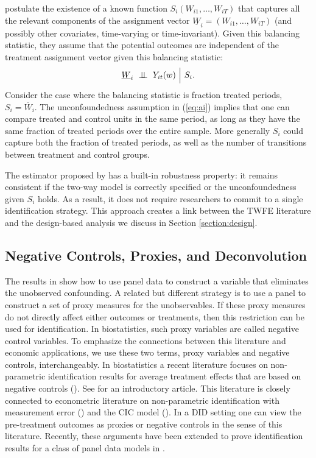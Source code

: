\documentclass[letterpaper,12pt,leqno]{article}
\newcommand{\indep}{\perp\!\!\!\perp}
\begin{document}
\citep*{arkhangelsky2022doubly} postulate the existence of a known function $S_i(W_{i1},\ldots,W_{iT})$ that captures all the relevant components of the assignment vector $\underline{W}_i=(W_{i1},\ldots,W_{iT})$ (and possibly other covariates, time-varying or time-invariant). Given this balancing statistic, they assume that the potential outcomes are independent of the treatment assignment vector given this balancing statistic:
\begin{equation}\label{eq:ai} \underline{W}_i\ \indep\  Y_{it}(w)\ \Bigl|\ S_i.\end{equation}
Consider the case where the balancing statistic is fraction treated periods, $S_i=\overline{W}_i$. The unconfoundedness assumption in (\ref{eq:ai})  implies that one can compare treated and control units in the same period, as long as they have the same fraction of treated periods over the entire sample. More generally $S_i$ could capture both the fraction of treated periods, as well as the number of transitions between treatment and control groups.

The estimator proposed by \citep*{arkhangelsky2022doubly} has a built-in robustness property: it remains consistent if the two-way model is correctly specified or the unconfoundedness given $S_i$ holds. As a result, it does not require researchers to commit to a single identification strategy. This approach creates a link between the TWFE literature and the design-based analysis we discuss in Section \ref{section:design}.




\subsection{Negative Controls, Proxies, and Deconvolution}\label{proxies}

The results in \citep{arkhangelsky2022doubly} show how to use panel data to construct a variable that eliminates the unobserved confounding. A related but different strategy is to use a panel to construct a set of proxy measures for the unobservables. If these proxy measures do not directly affect either outcomes or treatments, then this restriction can be used for identification. In biostatistics, such proxy variables are called negative control variables. To emphasize the connections between this literature and economic applications, we use these two terms, proxy variables and negative controls, interchangeably. 
In biostatistics a recent literature focuses on non-parametric identification results for average treatment effects that are based on negative controls (\citealp{sofer2016negative, shi2020multiply}). See \citep{ying2021proximal} for an introductory article. This literature is closely connected to econometric literature on non-parametric identification with measurement error (\citealp{hu2008instrumental}) and the CIC model (\citealp{athey2006identification}).
In a DID setting one can view the pre-treatment outcomes as proxies or negative controls in the sense of this literature.
Recently, these arguments have been extended to prove identification results for a class of panel data models in \citep{deaner2021proxy}. 
\end{document}
